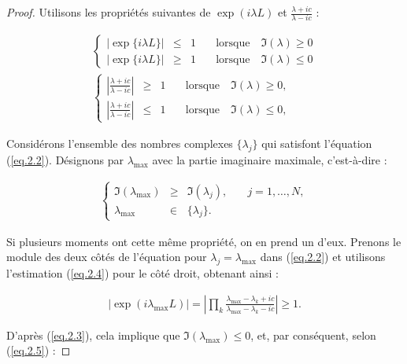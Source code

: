 \begin{proof}
	Utilisons les propriétés suivantes de \( \exp(i \lambda L) \) et \( \frac{\lambda + i c}{\lambda - i c} \) :
	
	\begin{eqnarray}
		\left \{ \begin{array}{rclr} \vert \exp\{ i \lambda L\}\vert  &\leq  &  1 & \quad \text{lorsque} \quad \Im(\lambda) \geq 0 \\ \vert \exp\{ i \lambda L\}\vert  &\geq  &  1 & \quad \text{lorsque} \quad \Im(\lambda) \leq  0  \end{array} \right . \label{eq.2.3}\\
		\left \{ \begin{array}{rclr} \displaystyle \left \vert  \frac{\lambda + ic}{\lambda - ic} \right \vert  &\geq  &  1  & \quad \text{lorsque} \quad \Im(\lambda) \geq  0, \\ \displaystyle \left \vert  \frac{\lambda + ic}{\lambda - ic} \right \vert  &\leq  &  1  & \quad \text{lorsque} \quad \Im(\lambda) \leq  0, \end{array} \right . \label{eq.2.4}
	\end{eqnarray}
	
	Considérons l'ensemble des nombres complexes \( \{\lambda_j\} \) qui satisfont l'équation (\ref{eq.2.2}). Désignons par \( \lambda_{\text{max}} \)  avec la partie imaginaire maximale, c'est-à-dire :
	
	\begin{eqnarray}
		\left \{ \begin{array}{rclr} \Im(\lambda_{\text{max}}) &  \geq  & \Im(\lambda_j),&  \quad j = 1, \dots, N, \\  \lambda_{\text{max}} & \in & \{\lambda_j\}.	 \end{array} \right . \label{eq.2.5}	
	\end{eqnarray}

	Si plusieurs moments ont cette même propriété, on en prend un d'eux. Prenons le module des deux côtés de l'équation pour \( \lambda_j = \lambda_{\text{max}} \) dans (\ref{eq.2.2}) et utilisons l'estimation (\ref{eq.2.4}) pour le côté droit, obtenant ainsi :
	
	\begin{eqnarray}
		|\exp(i \lambda_{\text{max}} L)| = \left| \prod_{k} \frac{\lambda_{\text{max}} - \lambda_k + ic}{\lambda_{\text{max}} - \lambda_k - ic} \right| \geq 1.	
	\end{eqnarray}

	D'après (\ref{eq.2.3}), cela implique que \( \Im(\lambda_{\text{max}}) \leq 0 \), et, par conséquent, selon (\ref{eq.2.5}) :
	

\end{proof}
